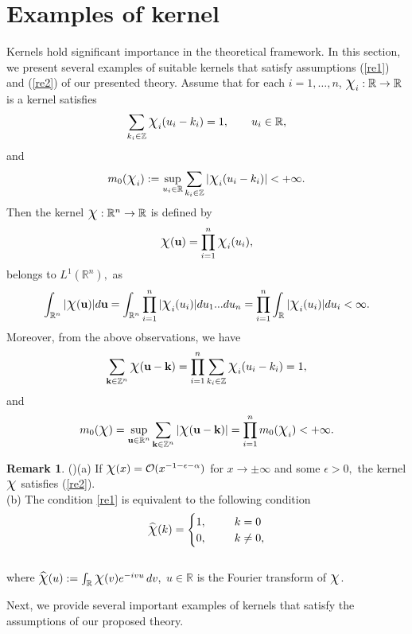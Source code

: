 \documentclass[11pt, a4paper]{article}
\theoremstyle{definition}
\newtheorem{rem}[thm]{Remark}
\numberwithin{equation}{section}
\def\ZZ{\mathbb Z}
\def\RR{\mathbb R}
\def\Chi{\mbox{\Large$\chi$}}
\begin{document}
\section{Examples of kernel} \label{6}
 Kernels hold significant importance in the theoretical framework.
In this section, we present several examples of suitable kernels that satisfy assumptions (\ref{re1}) and (\ref{re2}) of our presented theory. Assume that for each $i=1,\dots,n$, $\Chi_i:\RR\to \RR$ is a kernel satisfies
  $$\displaystyle \sum_{{k_i}\in \ZZ}\Chi_{i}({u_i}-{k_i})=1, \qquad u_i\in \RR,$$
  and 
  $$  m_{0}(\Chi_i) := \sup_{u_i \in \RR}\sum_{k_i \in \ZZ}|\Chi_i(u_i-k_i)|<+\infty.$$
Then the kernel $\Chi:\RR^n\to \RR$ is defined by
$$\displaystyle \Chi(\textbf{u})=\prod_{i=1}^{n}\Chi_{i}(u_i),$$ 
belongs to $L^{1}(\RR^n),$ as
$$\displaystyle \int_{\RR^n}|\Chi(\textbf{u})|d\textbf{u}=\int_{\RR^n}\prod_{i=1}^{n}|\Chi_{i}(u_i)|du_1...du_n=\prod_{i=1}^{n}\int_{\RR}|\Chi_{i}(u_i)|du_i < \infty.$$ 
Moreover, from the above observations, we have
$$ \sum_{\textbf{k}\in \ZZ^n}\Chi(\textbf{u}-\textbf{k})=\prod_{i=1}^{n}\sum_{k_i\in \ZZ}\Chi_i(u_i-k_i)=1,$$ and
$$m_{0}(\Chi)= \sup_{\textbf{u} \in \RR^n}\sum_{\textbf{k}\in \ZZ^n}|\Chi(\textbf{u}-\textbf{k})|=\prod_{i=1}^{n}m_{0}(\Chi_i)<+\infty.$$

\begin{rem} (\cite{bardaro10})\label{rem}
	(a)  If $\Chi(x)=\mathcal{O}(x^{-1-\epsilon-\alpha})$  for $x \rightarrow \pm \infty$ and some $\epsilon>0,$ the kernel $\Chi$ satisfies (\ref{re2}). \\
	(b) The condition \eqref{re1} is equivalent to the following condition
	$$
	\widehat{\Chi}(k)=
	\begin{cases}
		{1}, &\quad\text{} \ \  {k=0}\\
		{ 0,} &\quad\text{} \ \  {k \neq 0},\\
	\end{cases}$$\\
	where $\widehat{\Chi}(u) := \int_{\RR} \Chi(v)e^{-ivu}\,dv,$ $u \in \RR$ is the Fourier transform of $\Chi$.
\end{rem}

Next, we provide several important examples of kernels that satisfy the assumptions of our proposed theory.\\
\end{document}
